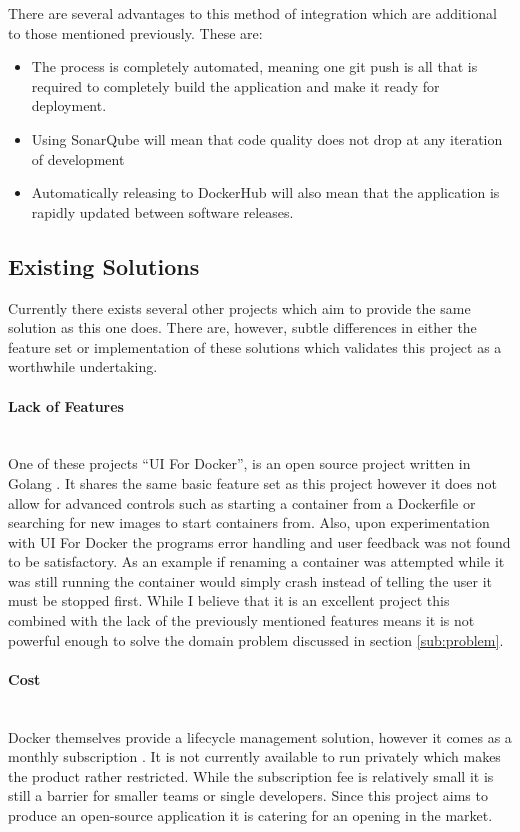 There are several advantages to this method of integration which are additional to those mentioned previously. These are:

\begin{itemize}
	\item The process is completely automated, meaning one git push is all that is required to completely build the application and make it ready for deployment.
	\item Using SonarQube will mean that code quality does not drop at any iteration of development
	\item Automatically releasing to DockerHub will also mean that the application is rapidly updated between software releases.
\end{itemize} 

\subsection{Existing Solutions}
Currently there exists several other projects which aim to provide the same solution as this one does. There are, however, subtle differences in either the feature set or implementation of these solutions which validates this project as a worthwhile undertaking. 

\paragraph{Lack of Features}\mbox{}\\
One of these projects ``UI For Docker'', is an open source project written in Golang \citep{UIRepo2016}. It shares the same basic feature set as this project however it does not allow for advanced controls such as starting a container from a Dockerfile or searching for new images to start containers from. Also, upon experimentation with UI For Docker the programs error handling and user feedback was not found to be satisfactory. As an example if renaming a container was attempted while it was still running the container would simply crash instead of telling the user it must be stopped first. While I believe that it is an excellent project this combined with the lack of the previously mentioned features means it is not powerful enough to solve the domain problem discussed in section \ref{sub:problem}. 

\paragraph{Cost}\mbox{}\\
Docker themselves provide a \gls{lifecycle management} solution, however it comes as a monthly subscription \citep{Docker2016}. It is not currently available to run privately which makes the product rather restricted. While the subscription fee is relatively small it is still a barrier for smaller teams or single developers. Since this project aims to produce an open-source application it is catering for an opening in the market.
